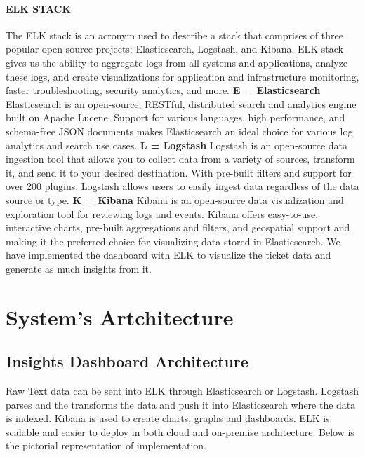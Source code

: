 \documentclass[a4paper,12pt]{report}
\begin{document}
    \subsubsection{ELK STACK}
    The ELK stack is an acronym used to describe a stack that comprises of three popular open-source projects: Elasticsearch, Logstash, and Kibana. ELK stack gives us the ability to aggregate logs from all systems and applications, analyze these logs, and create visualizations for application and infrastructure monitoring, faster troubleshooting, security analytics, and more. 
    \newline \textbf{E = Elasticsearch}
    \newline
    Elasticsearch is an open-source, RESTful, distributed search and analytics engine built on Apache Lucene. Support for various languages, high performance, and schema-free JSON documents makes Elasticsearch an ideal choice for various log analytics and search use cases.
    \newline \textbf{L = Logstash}
    \newline
    Logstash is an open-source data ingestion tool that allows you to collect data from a variety of sources, transform it, and send it to your desired destination. With pre-built filters and support for over 200 plugins, Logstash allows users to easily ingest data regardless of the data source or type.
    \newline \textbf{K = Kibana}
    \newline
    Kibana is an open-source data visualization and exploration tool for reviewing logs and events. Kibana offers easy-to-use, interactive charts, pre-built aggregations and filters, and geospatial support and making it the preferred choice for visualizing data stored in Elasticsearch.
    \newline
    We have implemented the dashboard with ELK to visualize the ticket data and generate as much insights from it.


    \chapter{System's Artchitecture}
    \section{Insights Dashboard Architecture}
    Raw Text data can be sent into ELK through Elasticsearch or Logstash. Logstash parses and the transforms the data and push it into Elasticsearch where the data is indexed. Kibana is used to create charts, graphs and dashboards. ELK is scalable and easier to deploy in both cloud and on-premise architecture. Below is the pictorial representation of implementation.
    
\end{document}
